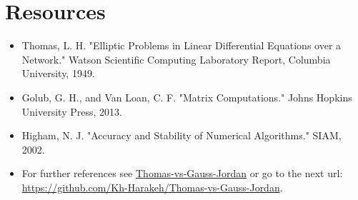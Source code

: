 \documentclass[a4paper,12pt]{article}
\begin{document}
\section*{Resources}
\begin{itemize}
    \item Thomas, L. H. "Elliptic Problems in Linear Differential Equations over a Network." Watson Scientific Computing Laboratory Report, Columbia University, 1949.
    \item Golub, G. H., and Van Loan, C. F. "Matrix Computations." Johns Hopkins University Press, 2013.
    \item Higham, N. J. "Accuracy and Stability of Numerical Algorithms." SIAM, 2002.
    \item For further references see \href{https://github.com/Kh-Harakeh/Thomas-vs-Gauss-Jordan}{Thomas-vs-Gauss-Jordan} 
or go to the next url: \url{https://github.com/Kh-Harakeh/Thomas-vs-Gauss-Jordan}.
\end{itemize}
\end{document}
